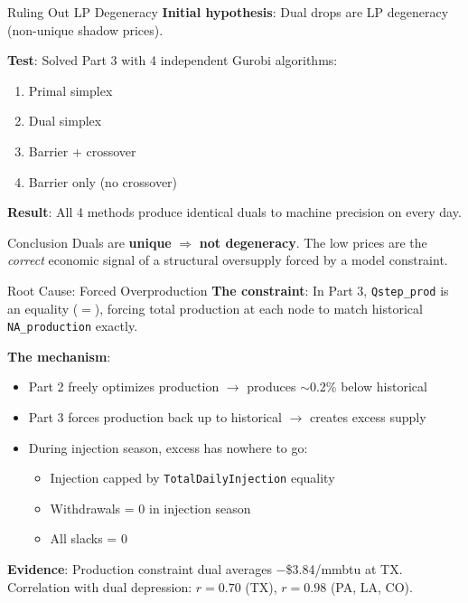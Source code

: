 \documentclass[aspectratio=169, 11pt]{beamer}
\begin{document}
\begin{frame}{Ruling Out LP Degeneracy}
  \textbf{Initial hypothesis}: Dual drops are LP degeneracy (non-unique shadow prices).
  \vspace{0.3em}

  \textbf{Test}: Solved Part 3 with 4 independent Gurobi algorithms:
  \begin{enumerate}
    \item Primal simplex
    \item Dual simplex
    \item Barrier + crossover
    \item Barrier only (no crossover)
  \end{enumerate}
  \vspace{0.3em}

  \textbf{Result}: All 4 methods produce \alert{identical duals to machine precision} on every day.
  \vspace{0.3em}

  \begin{block}{Conclusion}
    Duals are \textbf{unique} $\Rightarrow$ \textbf{not degeneracy}. The low prices are the \emph{correct} economic signal of a structural oversupply forced by a model constraint.
  \end{block}
\end{frame}

\begin{frame}{Root Cause: Forced Overproduction}
  \textbf{The constraint}: In Part 3, \texttt{Qstep\_prod} is an \alert{equality} ($=$), forcing total production at each node to match historical \texttt{NA\_production} exactly.

  \vspace{0.5em}
  \textbf{The mechanism}:
  \begin{itemize}
    \item Part 2 freely optimizes production $\to$ produces $\sim$0.2\% below historical
    \item Part 3 forces production back up to historical $\to$ creates excess supply
    \item During injection season, excess has nowhere to go:
      \begin{itemize}
        \item Injection capped by \texttt{TotalDailyInjection} equality
        \item Withdrawals = 0 in injection season
        \item All slacks = 0
      \end{itemize}
  \end{itemize}
  \vspace{0.3em}

  \textbf{Evidence}: Production constraint dual averages \alert{$-$\$3.84/mmbtu} at TX. \\
  Correlation with dual depression: $r = 0.70$ (TX), $r = 0.98$ (PA, LA, CO).
\end{frame}
\end{document}
